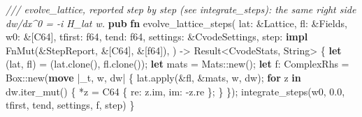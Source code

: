 \documentclass[
  10pt,
]{article}
\newenvironment{Shaded}{}{}
\newcommand{\BuiltInTok}[1]{\textcolor[rgb]{0.00,0.50,0.00}{#1}}
\newcommand{\CommentTok}[1]{\textcolor[rgb]{0.38,0.63,0.69}{\textit{#1}}}
\newcommand{\ControlFlowTok}[1]{\textcolor[rgb]{0.00,0.44,0.13}{\textbf{#1}}}
\newcommand{\DataTypeTok}[1]{\textcolor[rgb]{0.56,0.13,0.00}{#1}}
\newcommand{\DecValTok}[1]{\textcolor[rgb]{0.25,0.63,0.44}{#1}}
\newcommand{\KeywordTok}[1]{\textcolor[rgb]{0.00,0.44,0.13}{\textbf{#1}}}
\newcommand{\NormalTok}[1]{#1}
\newcommand{\OperatorTok}[1]{\textcolor[rgb]{0.40,0.40,0.40}{#1}}
\newcommand{\PreprocessorTok}[1]{\textcolor[rgb]{0.74,0.48,0.00}{#1}}
\begin{document}
\begin{Shaded}
\begin{Highlighting}[]
\CommentTok{/// \textasciigrave{}evolve\_lattice\textasciigrave{}, reported step by step (see \textasciigrave{}integrate\_steps\textasciigrave{}): the same right side dw/dx\^{}0 = {-}i H\_lat w.}
\KeywordTok{pub} \KeywordTok{fn}\NormalTok{ evolve\_lattice\_steps(}
\NormalTok{    lat}\OperatorTok{:} \OperatorTok{\&}\NormalTok{Lattice}\OperatorTok{,}
\NormalTok{    fl}\OperatorTok{:} \OperatorTok{\&}\NormalTok{Fields}\OperatorTok{,}
\NormalTok{    w0}\OperatorTok{:} \OperatorTok{\&}\NormalTok{[C64]}\OperatorTok{,}
\NormalTok{    tfirst}\OperatorTok{:} \DataTypeTok{f64}\OperatorTok{,}
\NormalTok{    tend}\OperatorTok{:} \DataTypeTok{f64}\OperatorTok{,}
\NormalTok{    settings}\OperatorTok{:} \OperatorTok{\&}\NormalTok{CvodeSettings}\OperatorTok{,}
\NormalTok{    step}\OperatorTok{:} \KeywordTok{impl} \BuiltInTok{FnMut}\NormalTok{(}\OperatorTok{\&}\NormalTok{StepReport}\OperatorTok{,} \OperatorTok{\&}\NormalTok{[C64]}\OperatorTok{,} \OperatorTok{\&}\NormalTok{[}\DataTypeTok{f64}\NormalTok{])}\OperatorTok{,}
\NormalTok{) }\OperatorTok{{-}\textgreater{}} \DataTypeTok{Result}\OperatorTok{\textless{}}\NormalTok{CvodeStats}\OperatorTok{,} \DataTypeTok{String}\OperatorTok{\textgreater{}} \OperatorTok{\{}
    \KeywordTok{let}\NormalTok{ (lat}\OperatorTok{,}\NormalTok{ fl) }\OperatorTok{=}\NormalTok{ (lat}\OperatorTok{.}\NormalTok{clone()}\OperatorTok{,}\NormalTok{ fl}\OperatorTok{.}\NormalTok{clone())}\OperatorTok{;}
    \KeywordTok{let}\NormalTok{ mats }\OperatorTok{=} \PreprocessorTok{Mats::}\NormalTok{new()}\OperatorTok{;}
    \KeywordTok{let}\NormalTok{ f}\OperatorTok{:}\NormalTok{ ComplexRhs }\OperatorTok{=} \DataTypeTok{Box}\PreprocessorTok{::}\NormalTok{new(}\KeywordTok{move} \OperatorTok{|}\NormalTok{\_t}\OperatorTok{,}\NormalTok{ w}\OperatorTok{,}\NormalTok{ dw}\OperatorTok{|} \OperatorTok{\{}
\NormalTok{        lat}\OperatorTok{.}\NormalTok{apply(}\OperatorTok{\&}\NormalTok{fl}\OperatorTok{,} \OperatorTok{\&}\NormalTok{mats}\OperatorTok{,}\NormalTok{ w}\OperatorTok{,}\NormalTok{ dw)}\OperatorTok{;}
        \ControlFlowTok{for}\NormalTok{ z }\KeywordTok{in}\NormalTok{ dw}\OperatorTok{.}\NormalTok{iter\_mut() }\OperatorTok{\{}
            \OperatorTok{*}\NormalTok{z }\OperatorTok{=}\NormalTok{ C64 }\OperatorTok{\{}\NormalTok{ re}\OperatorTok{:}\NormalTok{ z}\OperatorTok{.}\NormalTok{im}\OperatorTok{,}\NormalTok{ im}\OperatorTok{:} \OperatorTok{{-}}\NormalTok{z}\OperatorTok{.}\NormalTok{re }\OperatorTok{\};}
        \OperatorTok{\}}
    \OperatorTok{\}}\NormalTok{)}\OperatorTok{;}
\NormalTok{    integrate\_steps(w0}\OperatorTok{,} \DecValTok{0.0}\OperatorTok{,}\NormalTok{ tfirst}\OperatorTok{,}\NormalTok{ tend}\OperatorTok{,}\NormalTok{ settings}\OperatorTok{,}\NormalTok{ f}\OperatorTok{,}\NormalTok{ step)}
\OperatorTok{\}}


\end{Highlighting}
\end{Shaded}
\end{document}
